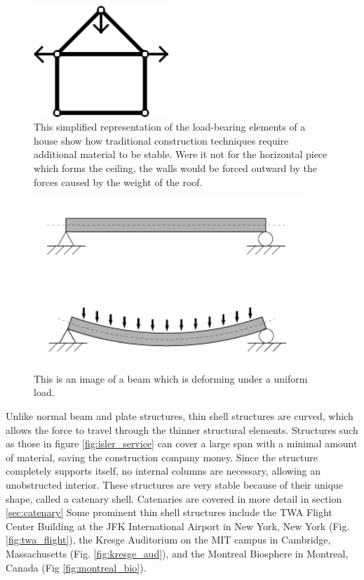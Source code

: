 \documentclass{thesis}
\begin{document}
\begin{figure}
\centering
\includegraphics[width=2in]{images/house.png}
\caption[Simplified representation of a house]{This simplified representation of the load-bearing elements of a house show how traditional
construction techniques require additional material to be stable.  Were it not for the horizontal piece which forms the ceiling, the walls
would be forced outward by the forces caused by the weight of the roof.}
\label{fig:house}
\end{figure}

\begin{figure}
\centering
\includegraphics[width=4in]{images/Bending.png}
\caption[A beam under uniform loading]{This is an image of a beam which is deforming under a uniform load.\footnotemark}
\label{fig:bending}
\end{figure}

Unlike normal beam and plate structures, thin shell structures are curved, which allows the force to travel through the thinner structural
elements.  Structures such as those in figure \ref{fig:isler_service} can cover a large span with a minimal amount of material, saving the
construction company money.  Since the structure completely supports itself, no internal columns are necessary, allowing an unobstructed interior.
These structures are very stable because of their unique shape, called a catenary shell.  Catenaries are covered in more detail in section
\ref{sec:catenary}  Some prominent thin shell structures include
the TWA Flight Center Building at the JFK International Airport in New York, New York (Fig. \ref{fig:twa_flight}), the Kresge Auditorium on
the MIT campus in Cambridge, Massachusetts (Fig. \ref{fig:kresge_aud}), and the Montreal Biosphere in Montreal, Canada (Fig \ref{fig:montreal_bio}).
\end{document}

